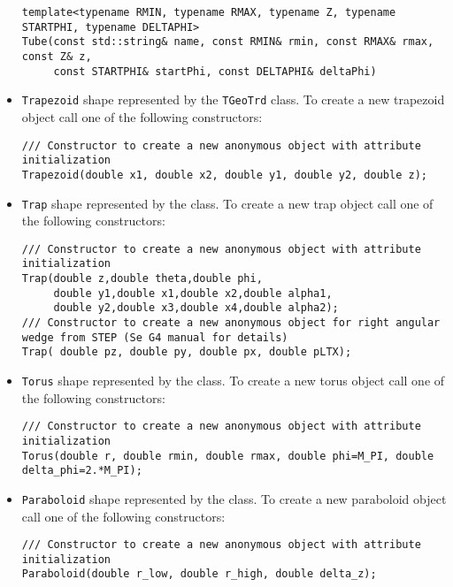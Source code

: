 \begin{itemize}
\begin{verbatim}
template<typename RMIN, typename RMAX, typename Z, typename STARTPHI, typename DELTAPHI>
Tube(const std::string& name, const RMIN& rmin, const RMAX& rmax, const Z& z, 
     const STARTPHI& startPhi, const DELTAPHI& deltaPhi)  
\end{verbatim}
\item \texttt{Trapezoid} shape represented by the \texttt{TGeoTrd} class. To create a new trapezoid object call one of the following constructors:
\begin{verbatim}
/// Constructor to create a new anonymous object with attribute initialization
Trapezoid(double x1, double x2, double y1, double y2, double z);
\end{verbatim}
\item \texttt{Trap} shape represented by the  class. To create a new trap object call one of the following constructors:
\begin{verbatim}
/// Constructor to create a new anonymous object with attribute initialization
Trap(double z,double theta,double phi,
     double y1,double x1,double x2,double alpha1,
     double y2,double x3,double x4,double alpha2);
/// Constructor to create a new anonymous object for right angular wedge from STEP (Se G4 manual for details)
Trap( double pz, double py, double px, double pLTX);
\end{verbatim}
\item \texttt{Torus}  shape represented by the  class. To create a new torus object call one of the following constructors:
\begin{verbatim}
/// Constructor to create a new anonymous object with attribute initialization
Torus(double r, double rmin, double rmax, double phi=M_PI, double delta_phi=2.*M_PI);
\end{verbatim}
\item \texttt{Paraboloid}  shape represented by the  class. To create a new paraboloid object call one of the following constructors:
\begin{verbatim}
/// Constructor to create a new anonymous object with attribute initialization
Paraboloid(double r_low, double r_high, double delta_z);

\end{verbatim}
\end{itemize}
